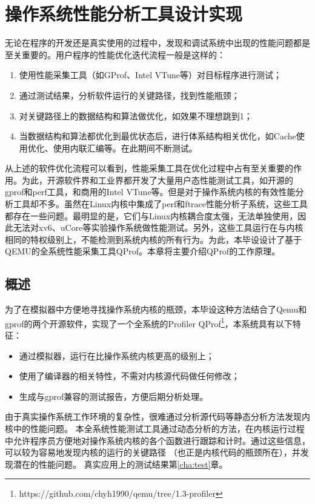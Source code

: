 


\chapter{操作系统性能分析工具设计实现}

无论在程序的开发还是真实使用的过程中，发现和调试系统中出现的性能问题都是至关重要的。用户程序的性能优化迭代流程一般是这样的：
\begin{enumerate}
\item 使用性能采集工具（如GProf、Intel VTune等）对目标程序进行测试；
\item 通过测试结果，分析软件运行的关键路径，找到性能瓶颈；
\item 对关键路径上的数据结构和算法做优化，如效果不理想跳到1；
\item
当数据结构和算法都优化到最优状态后，进行体系结构相关优化，如Cache使用优化、使用内联汇编等。在此期间不断测试。
\end{enumerate}

从上述的软件优化流程可以看到，性能采集工具在优化过程中占有至关重要的作用。为此，开源软件界和工业界都开发了大量用户态性能测试工具，如开源的gprof和perf工具，和商用的Intel
VTune等。但是对于操作系统内核的有效性能分析工具却不多。虽然在Linux内核中集成了perf和ftrace性能分析子系统，这些工具都存在一些问题。最明显的是，它们与Linux内核耦合度太强，无法单独使用，因此无法对xv6、uCore等实验操作系统做性能测试。另外，这些工具运行在与内核相同的特权级别上，不能检测到系统内核的所有行为。为此，本毕设设计了基于QEMU的全系统性能采集工具QProf。本章将主要介绍QProf的工作原理。

\section{概述}
为了在模拟器中方便地寻找操作系统内核的瓶颈，本毕设这种方法结合了Qemu和gprof的两个开源软件，实现了一个全系统的Profiler
\pozhehao
QProf\footnote{https://github.com/chyh1990/qemu/tree/1.3-profiler}，本系统具有以下特征：
\begin{itemize}
\item 通过模拟器，运行在比操作系统内核更高的级别上；
\item 使用了编译器的相关特性，不需对内核源代码做任何修改；
\item 生成与gprof兼容的测试报告，方便后期分析处理。
\end{itemize}

由于真实操作系统工作环境的复杂性，很难通过分析源代码等静态分析方法发现内核中的性能问题。
本全系统性能测试工具通过动态分析的方法，在内核运行过程中允许程序员方便地对操作系统内核的各个函数进行跟踪和计时。通过这些信息，可以较为容易地发现内核的运行的关键路径
（也正是内核代码的瓶颈所在），并发现潜在的性能问题。
真实应用上的测试结果第\ref{cha:test}章。

